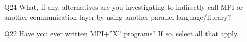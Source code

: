 \begin{description}%
\item{Q24} What, if any, alternatives are you investigating to indirectly call MPI or another communication layer by using another parallel language/library?%
\item{Q22} Have you ever written MPI+”X” programs? If so, select all that apply.%
\end{description}%
